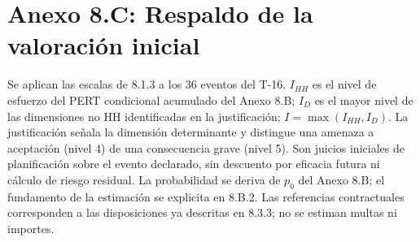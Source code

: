 \documentclass[carta,firma,sinnotas]{lafrox}
\begin{document}
\clearpage
\section{Anexo 8.C: Respaldo de la valoración inicial}

Se aplican las escalas de 8.1.3 a los 36 eventos del T-16. $I_{HH}$ es el nivel de esfuerzo del PERT condicional acumulado del Anexo 8.B; $I_D$ es el mayor nivel de las dimensiones no HH identificadas en la justificación; $I=\max(I_{HH},I_D)$. La justificación señala la dimensión determinante y distingue una amenaza a aceptación (nivel 4) de una consecuencia grave (nivel 5). Son juicios iniciales de planificación sobre el evento declarado, sin descuento por eficacia futura ni cálculo de riesgo residual. La probabilidad se deriva de $p_0$ del Anexo 8.B; el fundamento de la estimación se explicita en 8.B.2. Las referencias contractuales corresponden a las disposiciones ya descritas en 8.3.3; no se estiman multas ni importes.
\end{document}
